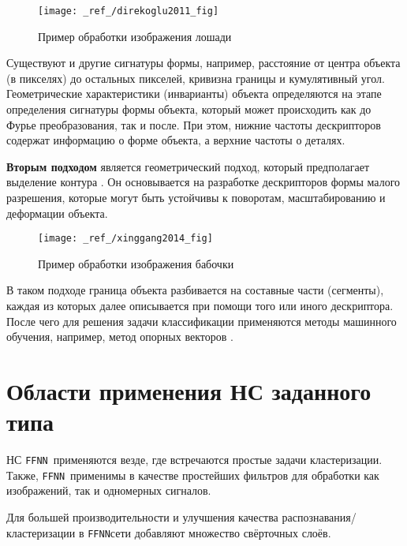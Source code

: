 \documentclass[12pt,a4paper]{article}
\newcommand{\ffnn}{\texttt{FFNN}}
\begin{document}
\begin{figure}[tbh!]
	\center
	\texttt{[image: \_ref\_/direkoglu2011\_fig]}
	\caption{Пример обработки изображения лошади \cite{direkoglu2011}}
\end{figure}
Существуют и другие сигнатуры формы, например, расстояние от центра объекта (в пикселях) до остальных пикселей,
кривизна границы и кумулятивный угол. Геометрические характеристики (инварианты) объекта
определяются на этапе определения сигнатуры формы объекта, который может происходить как до
Фурье преобразования, так и после. При этом, нижние частоты дескрипторов содержат
информацию о форме объекта, а верхние частоты о деталях.

\noindent
\textbf{Вторым подходом} является геометрический подход, который предполагает выделение контура \cite{wang2014}. 
Он основывается на разработке дескрипторов формы малого разрешения, которые могут быть
устойчивы к поворотам, масштабированию и деформации объекта.


\begin{figure}[tbh!]
	\center
	\texttt{[image: \_ref\_/xinggang2014\_fig]}
	\caption{Пример обработки изображения бабочки \cite{wang2014}}
\end{figure}

В таком подходе граница объекта разбивается на составные части (сегменты), каждая
из которых далее описывается при помощи того или иного дескриптора. После чего
для решения задачи классификации применяются методы машинного обучения, например,
метод опорных векторов \cite{svm}.


\section{Области применения НС заданного типа}
НС \ffnn\, применяются везде, где встречаются простые задачи кластеризации.
Также, \ffnn\, применимы в качестве простейших фильтров для обработки как изображений, так и одномерных сигналов.

Для большей производительности и улучшения качества распознавания/кластеризации в 
\ffnn сети
добавляют множество свёрточных слоёв.

\newpage
\appendix 
{}
\end{document}
